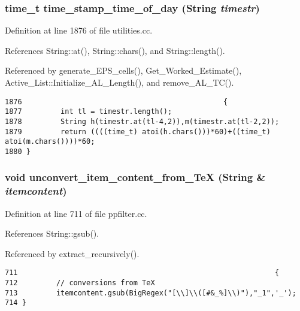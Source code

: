 \subsubsection{\setlength{\rightskip}{0pt plus 5cm}time\_\-t time\_\-stamp\_\-time\_\-of\_\-day ({\bf String} {\em timestr})}\label{dil2al_8hh_a222}




Definition at line 1876 of file utilities.cc.

References String::at(), String::chars(), and String::length().

Referenced by generate\_\-EPS\_\-cells(), Get\_\-Worked\_\-Estimate(), Active\_\-List::Initialize\_\-AL\_\-Length(), and remove\_\-AL\_\-TC().



\footnotesize\begin{verbatim}1876                                               {
1877         int tl = timestr.length();
1878         String h(timestr.at(tl-4,2)),m(timestr.at(tl-2,2));
1879         return ((((time_t) atoi(h.chars()))*60)+((time_t) atoi(m.chars())))*60;
1880 }
\end{verbatim}\normalsize 
{}
\subsubsection{\setlength{\rightskip}{0pt plus 5cm}void unconvert\_\-item\_\-content\_\-from\_\-Te\-X ({\bf String} \& {\em itemcontent})}\label{dil2al_8hh_a358}




Definition at line 711 of file ppfilter.cc.

References String::gsub().

Referenced by extract\_\-recursively().



\footnotesize\begin{verbatim}711                                                            {
712         // conversions from TeX
713         itemcontent.gsub(BigRegex("[\\]\\([#&_%]\\)"),"_1",'_');
714 }
\end{verbatim}\normalsize 
{}
